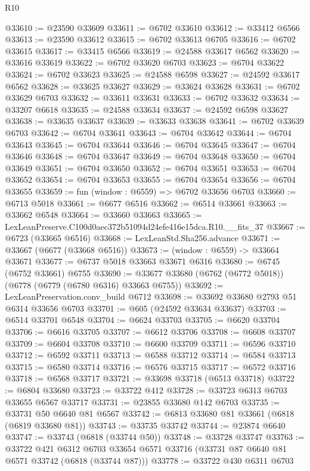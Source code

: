 \begin{lexlean}{R10}
\begin{coremodule}
@33610 := @23590 @33609
@33611 := @6702 @33610
@33612 := @33412 @6566
@33613 := @23590 @33612
@33615 := @6702 @33613 @6705
@33616 := @6702 @33615
@33617 := @33415 @6566
@33619 := @24588 @33617 @6562
@33620 := @33616 @33619
@33622 := @6702 @33620 @6703
@33623 := @6704 @33622
@33624 := @6702 @33623
@33625 := @24588 @6598
@33627 := @24592 @33617 @6562
@33628 := @33625 @33627
@33629 := @33624 @33628
@33631 := @6702 @33629 @6703
@33632 := @33611 @33631
@33633 := @6702 @33632
@33634 := @33207 @6618
@33635 := @24588 @33634
@33637 := @24592 @6598 @33627
@33638 := @33635 @33637
@33639 := @33633 @33638
@33641 := @6702 @33639 @6703
@33642 := @6704 @33641
@33643 := @6704 @33642
@33644 := @6704 @33643
@33645 := @6704 @33644
@33646 := @6704 @33645
@33647 := @6704 @33646
@33648 := @6704 @33647
@33649 := @6704 @33648
@33650 := @6704 @33649
@33651 := @6704 @33650
@33652 := @6704 @33651
@33653 := @6704 @33652
@33654 := @6704 @33653
@33655 := @6704 @33654
@33656 := @6704 @33655
@33659 := fun (window : @6559) => @6702 @33656 @6703
@33660 := @6713 @5018
@33661 := @6677 @6516
@33662 := @6514 @33661
@33663 := @33662 @6548
@33664 := @33660 @33663
@33665 := LexLeanPreserve.C100d0aec372b51094d24efe416e15dca.R10.__fits_37
@33667 := @6723 (@33665 @6516)
@33668 := LexLeanStd.Sha256.advance
@33671 := @33667 (@6677 (@33668 @6516))
@33673 := (window : @6559) -> @33664 @33671
@33677 := @6737 @5018 @33663 @33671 @6316
@33680 := @6745 (@6752 @33661) @6755
@33690 := @33677 @33680 (@6762 (@6772 @5018)) (@6778 (@6779 (@6780 @6316) @33663 @6755))
@33692 := LexLeanPreservation.conv_build @6712
@33698 := @33692 @33680 @2793 @51 @6314 @33656 @6703
@33701 := @605 (@24592 @33634 @33637)
@33703 := @6514 @33701 @6548
@33704 := @6624 @33703
@33705 := @6620 @33704
@33706 := @6616 @33705
@33707 := @6612 @33706
@33708 := @6608 @33707
@33709 := @6604 @33708
@33710 := @6600 @33709
@33711 := @6596 @33710
@33712 := @6592 @33711
@33713 := @6588 @33712
@33714 := @6584 @33713
@33715 := @6580 @33714
@33716 := @6576 @33715
@33717 := @6572 @33716
@33718 := @6568 @33717
@33721 := @33698 @33718 (@6513 @33718)
@33722 := @6804 @33680
@33723 := @33722 @412
@33728 := @33723 @6313 @6703 @33655 @6567 @33717
@33731 := @23855 @33680 @142 @6703
@33735 := @33731 @50 @6640 @81 @6567
@33742 := @6813 @33680 @81 @33661 (@6818 (@6819 @33680 @81))
@33743 := @33735 @33742
@33744 := @23874 @6640
@33747 := @33743 (@6818 (@33744 @50))
@33748 := @33728 @33747
@33763 := @33722
    @421
    @6312
    @6703
    @33654
    @6571
    @33716
    (@33731 @87 @6640 @81 @6571 @33742 (@6818 (@33744 @87)))
@33778 := @33722
    @430
    @6311
    @6703

\end{coremodule}
\end{lexlean}
